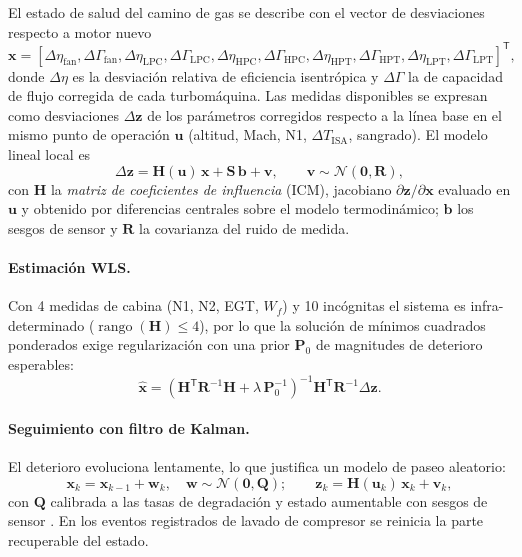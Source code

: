 El estado de salud del camino de gas se describe con el vector de desviaciones respecto a motor
nuevo
\begin{equation}
  \mathbf{x} = \left[\Delta\eta_{\mathrm{fan}}, \Delta\Gamma_{\mathrm{fan}},
  \Delta\eta_{\mathrm{LPC}}, \Delta\Gamma_{\mathrm{LPC}},
  \Delta\eta_{\mathrm{HPC}}, \Delta\Gamma_{\mathrm{HPC}},
  \Delta\eta_{\mathrm{HPT}}, \Delta\Gamma_{\mathrm{HPT}},
  \Delta\eta_{\mathrm{LPT}}, \Delta\Gamma_{\mathrm{LPT}}\right]^{\mathsf T},
\end{equation}
donde $\Delta\eta$ es la desviación relativa de eficiencia isentrópica y $\Delta\Gamma$ la de
capacidad de flujo corregida de cada turbomáquina. Las medidas disponibles se expresan como
desviaciones $\Delta\mathbf{z}$ de los parámetros corregidos respecto a la línea base en el
mismo punto de operación $\mathbf{u}$ (altitud, Mach, N1, $\Delta T_{\mathrm{ISA}}$, sangrado).
El modelo lineal local es
\begin{equation}
  \Delta\mathbf{z} = \mathbf{H}(\mathbf{u})\,\mathbf{x} + \mathbf{S}\,\mathbf{b} + \mathbf{v},
  \qquad \mathbf{v}\sim\mathcal{N}(\mathbf{0},\mathbf{R}),
  \label{eq:gpa-lineal}
\end{equation}
con $\mathbf{H}$ la \emph{matriz de coeficientes de influencia} (ICM), jacobiano
$\partial\mathbf{z}/\partial\mathbf{x}$ evaluado en $\mathbf{u}$ y obtenido por diferencias
centrales sobre el modelo termodinámico; $\mathbf{b}$ los sesgos de sensor y $\mathbf{R}$ la
covarianza del ruido de medida.

\paragraph{Estimación WLS.} Con 4 medidas de cabina (N1, N2, EGT, $W_f$) y 10 incógnitas el
sistema es infra-determinado ($\operatorname{rango}(\mathbf{H})\leq 4$), por lo que la solución
de mínimos cuadrados ponderados exige regularización con una prior $\mathbf{P}_0$ de magnitudes
de deterioro esperables:
\begin{equation}
  \hat{\mathbf{x}} = \left(\mathbf{H}^{\mathsf T}\mathbf{R}^{-1}\mathbf{H}
  + \lambda\,\mathbf{P}_0^{-1}\right)^{-1}\mathbf{H}^{\mathsf T}\mathbf{R}^{-1}\Delta\mathbf{z}.
  \label{eq:wls}
\end{equation}

\paragraph{Seguimiento con filtro de Kalman.} El deterioro evoluciona lentamente, lo que
justifica un modelo de paseo aleatorio:
\begin{equation}
  \mathbf{x}_k = \mathbf{x}_{k-1} + \mathbf{w}_k, \quad \mathbf{w}\sim\mathcal{N}(\mathbf{0},\mathbf{Q});
  \qquad
  \mathbf{z}_k = \mathbf{H}(\mathbf{u}_k)\,\mathbf{x}_k + \mathbf{v}_k,
  \label{eq:kalman}
\end{equation}
con $\mathbf{Q}$ calibrada a las tasas de degradación y estado aumentable con sesgos de sensor
\cite{Volponi2014}. En los eventos registrados de lavado de compresor se reinicia la parte
recuperable del estado.

